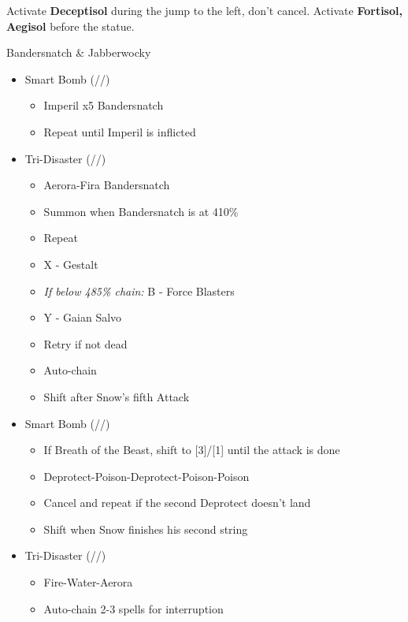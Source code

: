 \begin{multicols}{2}
	Activate \textbf{Deceptisol} during the jump to the left, don't cancel.
	Activate \textbf{Fortisol, Aegisol} before the statue.
	\vfill


	\renewcommand{\second}{[2] Devastation (\sab/\com/\com)}
	\renewcommand{\fifth}{[5] Smart Bomb (\sab/\rav/\rav)}
	\renewcommand{\sixth}{[6] Tri-Disaster (\rav/\rav/\rav)}
	\begin{battle}{Bandersnatch \& Jabberwocky}
		\begin{itemize}
			\item \fifth
			      \begin{itemize}
				      \item Imperil x5 Bandersnatch
				      \item Repeat until Imperil is inflicted
			      \end{itemize}
			\item \sixth
			      \begin{itemize}
				      \item Aerora-Fira Bandersnatch
				      \item Summon when Bandersnatch is at 410\%
				      \item Repeat
				      \item X - Gestalt
				      \item {\it If below 485\% chain:} B - Force Blasters
				      \item Y - Gaian Salvo
				      \item Retry if not dead
				      \item Auto-chain
				      \item Shift after Snow's fifth Attack
			      \end{itemize}
			\item \fifth
			      \begin{itemize}
				      \item If Breath of the Beast, shift to [3]/[1] until the attack is done
				      \item Deprotect-Poison-Deprotect-Poison-Poison
				      \item Cancel and repeat if the second Deprotect doesn't land
				      \item Shift when Snow finishes his second string
			      \end{itemize}
			\item \sixth
			      \begin{itemize}
				      \item Fire-Water-Aerora
				      \item Auto-chain 2-3 spells for interruption

\end{itemize}
\end{itemize}
\end{battle}
\end{multicols}
